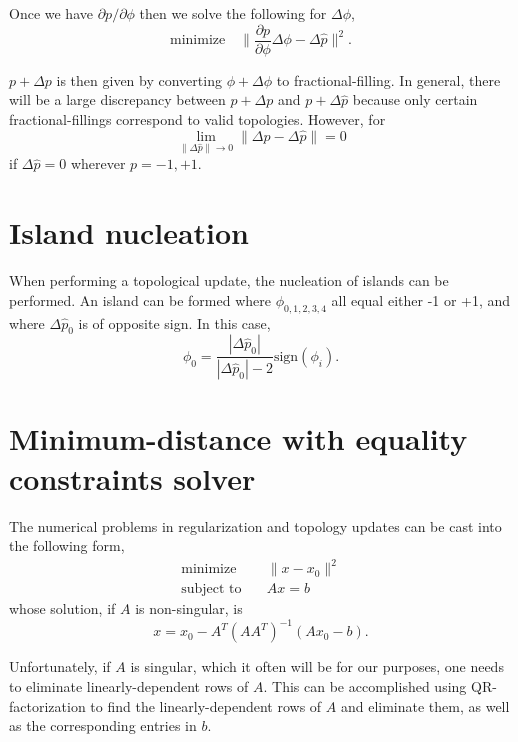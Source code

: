 \documentclass{article}
\begin{document}
Once we have $\partial p / \partial \phi$ then we solve the following for $\Delta \phi$,
\begin{equation}
    \text{minimize} \quad  
        \| \frac{\partial p}{\partial \phi} \Delta \phi - \Delta \hat{p} \|^2.
\end{equation}

$p + \Delta p$ is then given by converting $\phi + \Delta\phi$ to fractional-filling. In general, there will be a large discrepancy between $p + \Delta p$ and $p + \Delta \hat{p}$ because only certain fractional-fillings correspond to valid topologies. However, for 
\begin{equation}
    \lim_{\|\Delta\hat{p}\| \to 0} \|\Delta p - \Delta\hat{p}\| = 0
\end{equation}
if $\Delta\hat{p} = 0$ wherever $p = -1, +1$. 

\section{Island nucleation}
When performing a topological update, the nucleation of islands can be performed. An island can be formed where $\phi_{0,1,2,3,4}$ all equal either -1 or +1, and where $\Delta\hat{p}_0$ is of opposite sign. In this case,
\begin{equation}
\phi_0 = \frac{|\Delta \hat{p}_0|}{|\Delta \hat{p}_0| - 2} \text{sign}(\phi_i).
\end{equation}    



\appendix
\section{Minimum-distance with equality constraints solver}
The numerical problems in regularization and topology updates can be cast into the following form,
\begin{align}
    \text{minimize} \quad & \| x - x_0 \|^2 \\
    \text{subject to} \quad & Ax = b
\end{align}
whose solution, if $A$ is non-singular, is
\begin{equation}
    x = x_0 - A^T (A A^T)^{-1} (A x_0 - b).
\end{equation}

Unfortunately, if $A$ is singular, which it often will be for our purposes, one needs to eliminate linearly-dependent rows of $A$. This can be accomplished using QR-factorization to find the linearly-dependent rows of $A$ and eliminate them, as well as the corresponding entries in $b$.
\end{document}
